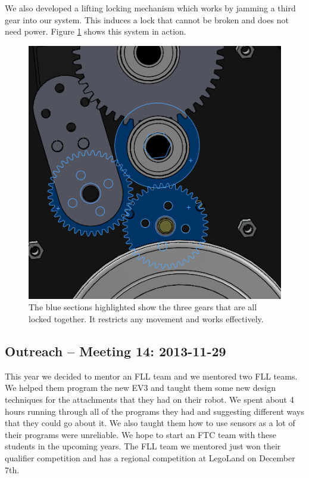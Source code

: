 We also developed a lifting locking mechanism which works by jamming a third gear into our system. This induces a lock that cannot be broken and does not need power. Figure \ref{locking} shows this system in action.

\begin{figure}[H]
\begin{center}
\includegraphics[scale=0.75]{images/Gearlock.png}
\end{center}
\caption{The blue sections highlighted show the three gears that are all locked together. It restricts any movement and works effectively.}
\label{locking}
\end{figure}

\newpage \subsection{Outreach -- Meeting 14: 2013-11-29}
This year we decided to mentor an FLL team and we mentored two FLL teams. We helped them program the new EV3 and taught them some new design techniques for the attachments that they had on their robot. We spent about 4 hours running through all of the programs they had and suggesting different ways that they could go about it. We also taught them how to use sensors as a lot of their programs were unreliable. We hope to start an FTC team with these students in the upcoming years. The FLL team we mentored just won their qualifier competition and has a regional competition at LegoLand on December 7th. 

